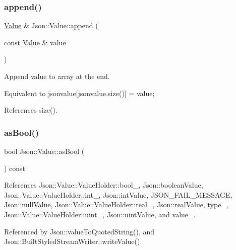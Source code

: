\subsubsection{\texorpdfstring{append()}{append()}}
{\footnotesize\ttfamily \hyperlink{classJson_1_1Value}{Value} \& Json\+::\+Value\+::append (\begin{DoxyParamCaption}\item[{const \hyperlink{classJson_1_1Value}{Value} \&}]{value }\end{DoxyParamCaption})}



Append value to array at the end. 

Equivalent to jsonvalue\mbox{[}jsonvalue.\+size()\mbox{]} = value; 

References size().

\mbox{\label{classJson_1_1Value_ab693fb7b9b1595bb0adc49658bbf780d_ab693fb7b9b1595bb0adc49658bbf780d}} 
\subsubsection{\texorpdfstring{as\+Bool()}{asBool()}}
{\footnotesize\ttfamily bool Json\+::\+Value\+::as\+Bool (\begin{DoxyParamCaption}{ }\end{DoxyParamCaption}) const}



References Json\+::\+Value\+::\+Value\+Holder\+::bool\+\_\+, Json\+::boolean\+Value, Json\+::\+Value\+::\+Value\+Holder\+::int\+\_\+, Json\+::int\+Value, J\+S\+O\+N\+\_\+\+F\+A\+I\+L\+\_\+\+M\+E\+S\+S\+A\+GE, Json\+::null\+Value, Json\+::\+Value\+::\+Value\+Holder\+::real\+\_\+, Json\+::real\+Value, type\+\_\+, Json\+::\+Value\+::\+Value\+Holder\+::uint\+\_\+, Json\+::uint\+Value, and value\+\_\+.



Referenced by Json\+::value\+To\+Quoted\+String(), and Json\+::\+Built\+Styled\+Stream\+Writer\+::write\+Value().

\mbox{\label{classJson_1_1Value_a16668c8db7ef0a5de040012f0dfd84b0_a16668c8db7ef0a5de040012f0dfd84b0}} 

